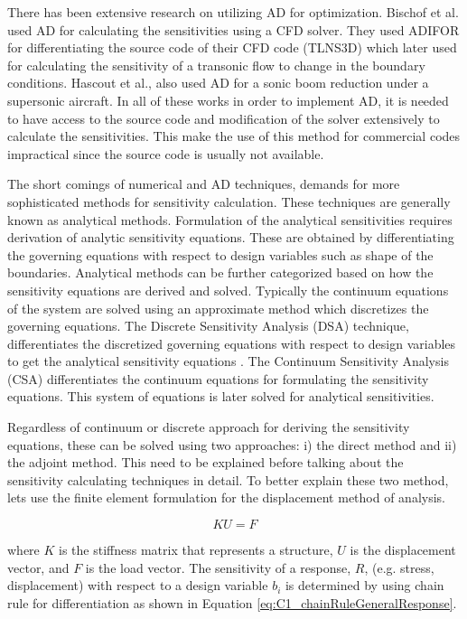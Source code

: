 There has been extensive research on utilizing AD for optimization. Bischof et al. used AD for calculating the sensitivities using a CFD solver. They used ADIFOR for differentiating the source code of their CFD code (TLNS3D) which later used for calculating the sensitivity of a transonic flow to change in the boundary conditions. Hascout et al., also used AD for a sonic boom reduction under a supersonic aircraft. In all of these works in order to implement AD, it is needed to have access to the source code and modification of the solver extensively to calculate the sensitivities. This make the use of this method for commercial codes impractical since the source code is usually not available.

The short comings of numerical and AD techniques, demands for more sophisticated methods for sensitivity calculation. These techniques are generally known as analytical methods. Formulation of the analytical sensitivities requires derivation of analytic sensitivity equations. These are obtained by differentiating the governing equations with respect to design variables such as shape of the boundaries. Analytical methods can be further categorized based on how the sensitivity equations are derived and solved. Typically the continuum equations of the system are solved using an approximate method which discretizes the governing equations. The Discrete Sensitivity Analysis (DSA) technique, differentiates the discretized governing equations with respect to design variables to get the analytical sensitivity equations \cite{choi2006structural}. The Continuum Sensitivity Analysis (CSA) differentiates the continuum equations for formulating the sensitivity equations. This system of equations is later solved for analytical sensitivities.

Regardless of continuum or discrete approach for deriving the sensitivity equations, these can be solved using two approaches: i) the direct method and ii) the adjoint method. This need to be explained before talking about the sensitivity calculating techniques in detail. To better explain these two method, lets use the finite element formulation for the displacement method of analysis.

\begin{equation}\label{eq:C1_finiteElementGE}
	KU = F
\end{equation}

where $K$ is the stiffness matrix that represents a structure, $U$ is the displacement vector, and $F$ is the load vector. The sensitivity of a response, $R$, (e.g. stress, displacement) with respect to a design variable $b_i$ is determined by using chain rule for differentiation as shown in Equation \eqref{eq:C1_chainRuleGeneralResponse}.

